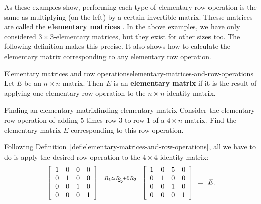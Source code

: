 \documentclass{ximera}
\begin{document}
As these examples show, performing each type of elementary row
operation is the same as multiplying (on the left) by a certain
invertible matrix. Thesse matrices are called the \textbf{elementary
  matrices}%
%
. In the
above examples, we have only considered $3\times 3$-elementary
matrices, but they exist for other sizes too. The following definition
makes this precise. It also shows how to calculate the elementary
matrix corresponding to any elementary row operation.

\begin{definition}{Elementary matrices and row operations}{elementary-matrices-and-row-operations}
  Let $E$ be an $n\times n$-matrix. Then $E$ is an \textbf{elementary
    matrix}%
  if it is the result of applying one elementary row operation to the
  $n\times n$ identity matrix.
\end{definition}

\begin{example}{Finding an elementary matrix}{finding-elementary-matrix}
  Consider the elementary row operation of adding $5$ times row 3 to
  row 1 of a $4\times n$-matrix. Find the elementary matrix $E$
  corresponding to this row operation.
\end{example}

\begin{solution}
  Following Definition~\ref{def:elementary-matrices-and-row-operations}, all
  we have to do is apply the desired row operation to the
  $4\times 4$-identity matrix:
  \begin{equation*}
    \startmat{rrrr}
      1 & 0 & 0 & 0 \\
      0 & 1 & 0 & 0 \\
      0 & 0 & 1 & 0 \\
      0 & 0 & 0 & 1 \\
    \stopmat
    \quad
    \stackrel{R_1\rowop R_1+5R_3}{\roweq}
    \quad
    \startmat{rrrr}
      1 & 0 & 5 & 0 \\
      0 & 1 & 0 & 0 \\
      0 & 0 & 1 & 0 \\
      0 & 0 & 0 & 1 \\
    \stopmat
    ~=~ E.
  \end{equation*}
\end{solution}
\end{document}
